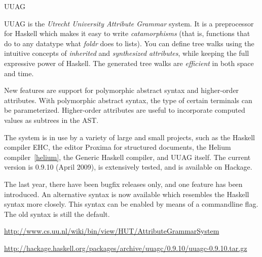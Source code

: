 \begin{hcarentry}[updated]{UUAG}
\makeheader

UUAG is the \emph{Utrecht University Attribute Grammar} system. It is a preprocessor for Haskell which makes it easy to write \emph{catamorphisms} (that is, functions that do to any datatype what \emph{foldr} does to lists). You can define tree walks using the intuitive concepts of \emph{inherited} and \emph{synthesized attributes}, while keeping the full expressive power of Haskell. The generated tree walks are \emph{efficient} in both space and time.

New features are support for polymorphic abstract syntax and higher-order attributes. With polymorphic abstract syntax, the type of certain terminals can be parameterized. Higher-order attributes are useful to incorporate computed values as subtrees in the AST.

The system is in use by a variety of large and small projects, such as the Haskell compiler EHC, the editor Proxima for structured documents, the Helium compiler~\cref{helium}, the Generic Haskell compiler, and UUAG itself. The current version is 0.9.10 (April 2009), is extensively tested, and is available on Hackage.

The last year, there have been bugfix releases only, and one feature has been introduced. An alternative syntax is now available which resembles the Haskell syntax more closely. This syntax can be enabled by means of a commandline flag. The old syntax is still the default.

\FurtherReading
\begin{compactitem}
\item
  \url{http://www.cs.uu.nl/wiki/bin/view/HUT/AttributeGrammarSystem}
\item
  \url{http://hackage.haskell.org/packages/archive/uuagc/0.9.10/uuagc-0.9.10.tar.gz}
\end{compactitem}
\end{hcarentry}
